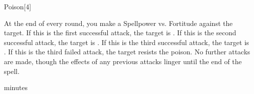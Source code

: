 \begin{spellsection}{Poison}[4]
    \begin{spellheader}
    \end{spellheader}
    \begin{spellcontent}
        \begin{spelltargetinginfo}
        \end{spelltargetinginfo}
        \begin{spelleffects}
            \begin{spellattacktriggered}{At the end of every round, you make a Spellpower vs. Fortitude against the target.}
                \spellsuccess If this is the first successful attack, the target is \sickened. If this is the second successful attack, the target is \nauseated. If this is the third successful attack, the target is \paralyzed.
                \spellfailure If this is the third failed attack, the target resists the poison. No further attacks are made, though the effects of any previous attacks linger until the end of the spell.
            \end{spellattacktriggered}
             minutes
        \end{spelleffects}
    \end{spellcontent}
    \begin{spellfooter}
        \miscastrandom
    \end{spellfooter}
\end{spellsection}

